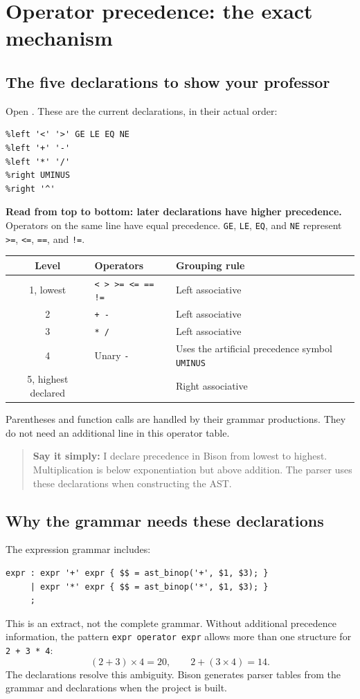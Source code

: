 \documentclass[11pt,a4paper]{report}
\newcommand{\file}[1]{\texttt{\detokenize{#1}}}
\newcommand{\say}[1]{\begin{quote}\textbf{Say it simply:} #1\end{quote}}
\begin{document}
\chapter{Operator precedence: the exact mechanism}
\section{The five declarations to show your professor}
Open \file{src/parser.y}. These are the current declarations, in their actual order:
\begin{lstlisting}
%left '<' '>' GE LE EQ NE
%left '+' '-'
%left '*' '/'
%right UMINUS
%right '^'
\end{lstlisting}
\textbf{Read from top to bottom: later declarations have higher precedence.}
Operators on the same line have equal precedence. \texttt{GE}, \texttt{LE},
\texttt{EQ}, and \texttt{NE} represent \texttt{>=}, \texttt{<=},
\texttt{==}, and \texttt{!=}.

\begin{center}
\begin{tabularx}{\textwidth}{@{}clX@{}}
\toprule
Level & Operators & Grouping rule\\
\midrule
1, lowest & \texttt{< > >= <= == !=} & Left associative\\
2 & \texttt{+ -} & Left associative\\
3 & \texttt{* /} & Left associative\\
4 & Unary \texttt{-} & Uses the artificial precedence symbol \texttt{UMINUS}\\
5, highest declared & \texttt{\char94} & Right associative\\
\bottomrule
\end{tabularx}
\end{center}
Parentheses and function calls are handled by their grammar productions.
They do not need an additional line in this operator table.

\say{I declare precedence in Bison from lowest to highest. Multiplication
is below exponentiation but above addition. The parser uses these declarations
when constructing the AST.}

\section{Why the grammar needs these declarations}
The expression grammar includes:
\begin{lstlisting}
expr : expr '+' expr { $$ = ast_binop('+', $1, $3); }
     | expr '*' expr { $$ = ast_binop('*', $1, $3); }
     ;
\end{lstlisting}
This is an extract, not the complete grammar. Without additional precedence
information, the pattern \texttt{expr operator expr} allows more than one
structure for \texttt{2 + 3 * 4}:
\[
(2+3)\times4=20,\qquad 2+(3\times4)=14.
\]
The declarations resolve this ambiguity. Bison generates parser tables from
the grammar and declarations when the project is built.
\end{document}
